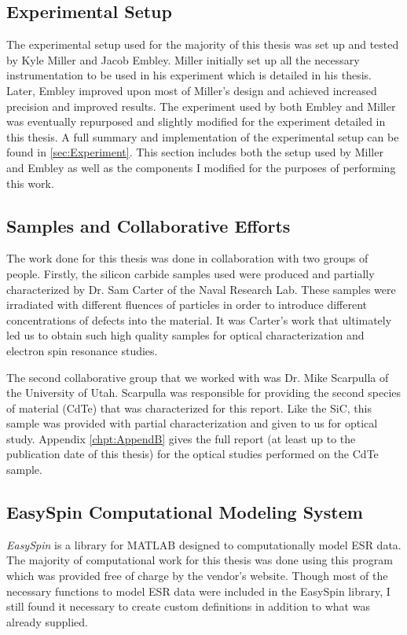 \documentclass[oneside, astronomy, noacknowlegments]{BYUPhys}
\begin{document}
\subsection{Experimental Setup}

The experimental setup used for the majority of this thesis was set up and tested by Kyle Miller and Jacob Embley. Miller initially set up all the necessary instrumentation to be used in his experiment which is detailed in his thesis. Later, Embley improved upon most of Miller's design and achieved increased precision and improved results. The experiment used by both Embley and Miller was eventually repurposed and slightly modified for the experiment detailed in this thesis. A full summary and implementation of the experimental setup can be found in \ref{sec:Experiment}. This section includes both the setup used by Miller and Embley as well as the components I modified for the purposes of performing this work.

\subsection{Samples and Collaborative Efforts}

The work done for this thesis was done in collaboration with two groups of people. Firstly, the silicon carbide samples used were produced and partially characterized by Dr. Sam Carter of the Naval Research Lab. These samples were irradiated with different fluences of particles in order to introduce different concentrations of defects into the material. It was Carter's work that ultimately led us to obtain such high quality samples for optical characterization and electron spin resonance studies.

The second collaborative group that we worked with was Dr. Mike Scarpulla of the University of Utah. Scarpulla was responsible for providing the second species of material (CdTe) that was characterized for this report. Like the SiC, this sample was provided with partial characterization and given to us for optical study. Appendix \ref{chpt:AppendB} gives the full report (at least up to the publication date of this thesis) for the optical studies performed on the CdTe sample.

\subsection{EasySpin Computational Modeling System}

\textit{EasySpin} is a library for MATLAB designed to computationally model ESR data. The majority of computational work for this thesis was done using this program which was provided free of charge by the vendor's website. Though most of the necessary functions to model ESR data were included in the EasySpin library, I still found it necessary to create custom definitions in addition to what was already supplied.
\end{document}
